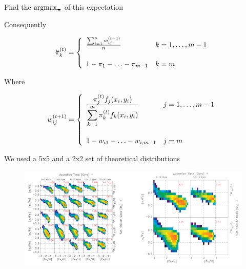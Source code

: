 \documentclass{beamer}
\newcommand{\vect}[1]{\boldsymbol{\mathbf{#1}}}
\newcommand{\argmax}{\operatornamewithlimits{argmax}}
\newcommand{\eqnset}[4]{
\[ #1 = #2 \left\{ \begin{array}{#3}
        #4
\end{array} \right. \] 
}
\newcommand{\vp}{\vect{\pi}}
\newcommand{\sumn}{\sum^n_{i=1}}
\newcommand{\sumk}{\sum^m_{k=1}}
\newcommand{\fab}{f_j}
\begin{document}
\begin{frame}{Find the $\argmax_{\vp}$ of this expectation}
	
	
	Consequently
	\eqnset{\hat{\pi}^{(t)}_k }{}{ll}{
		\frac{\sumn w^{(t-1)}_{ij}}{n}			& k=1,\ldots,m-1	\\
		\vspace{1mm} & \\
		1-\pi_1-\ldots-\pi_{m-1}		& k=m
	}
	
		Where
	\eqnset{w^{(t+1)}_{ij}}{}{ll}{
		\frac{\displaystyle\pi^{(t)}_{j} \fab(x_i,y_i)}{\displaystyle\sumk \pi^{(t)}_{k}f_k(x_i,y_i)}				& j=1,\ldots,m-1	\\
		\vspace{1mm} & \\
		1 - w_{i1} - \ldots - w_{i,m-1}		& j=m
	}
	
\end{frame}





\begin{frame}{We used a 5x5 and a 2x2 set of theoretical distributions}
		
	\begin{figure}
			\begin{center}
				\includegraphics[width=\textwidth]{ourdens.pdf}
			\end{center}
	\end{figure}
	
	
	
	
\end{frame}
\end{document}
